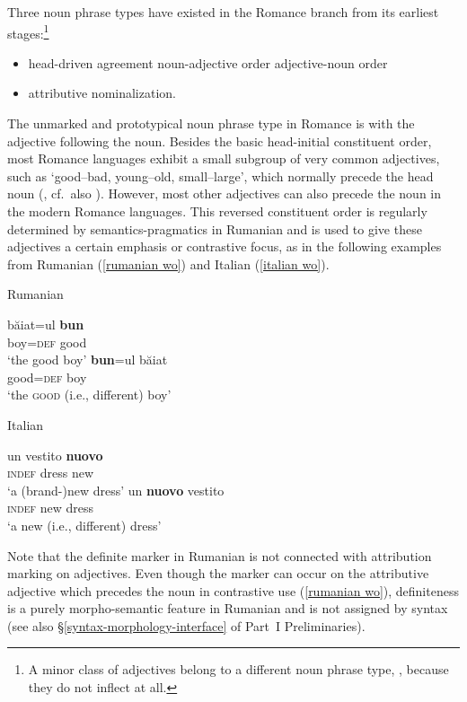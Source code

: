 Three noun phrase types have existed in the Romance branch from its earliest stages:\footnote{A minor class of adjectives belong to a different noun phrase type, 
, because they do not inflect at all.}
\begin{itemize}
\item head\hyp{}driven agreement
	\subitem noun-adjective order
	\subitem adjective-noun order
\item attributive nominalization.
\end{itemize}
The unmarked and prototypical noun phrase type in Romance is  with the adjective following the noun. Besides the basic head-initial constituent order, most Romance languages exhibit a small subgroup of very common adjectives, such as ‘good–bad, young–old, small–large’, which normally precede the head noun (\citealt[146–147]{posner1996}, cf.~also \citealt[340]{silvestri1998}). However, most other adjectives can also precede the noun in the modern Romance languages. This reversed constituent order is regularly determined by semantics-pragmatics in Rumanian and is used to give these adjectives a certain emphasis or contrastive focus, as in the following examples from Rumanian (\ref{rumanian wo}) and Italian (\ref{italian wo}).
\begin{exe}
\ex
\begin{xlist} 
\ex \rm{Rumanian \citep{beyer-etal1987}}\\
\label{rumanian wo} 
\begin{xlist}
\ex	
\gll	băiat=ul \textbf{bun}\\
	boy=\textsc{def} good\\
\glt	‘the good boy’
\ex	
\gll	\textbf{bun}=ul băiat\\
	good=\textsc{def} boy\\
\glt	‘the \textsc{good} (i.e., different) boy’ 
\end{xlist}
\ex \rm{Italian \citep[146]{posner1996}}
\label{italian wo}
\begin{xlist}
\ex	
\gll	un vestito \textbf{nuovo}\\
	\textsc{indef} dress new\\
\glt	‘a (brand-)new dress’
\ex	
\gll	un \textbf{nuovo} vestito\\
	\textsc{indef} new dress\\
\glt	‘a new (i.e., different) dress’
\end{xlist}
\end{xlist}
\end{exe}
Note that the definite marker in Rumanian is not connected with attribution marking on adjectives. Even though the marker can occur on the attributive adjective which precedes the noun in contrastive use (\ref{rumanian wo}), definiteness is a purely morpho-semantic feature in Rumanian and is not assigned by syntax (see also \S\ref{syntax-morphology-interface} of Part~I Preliminaries).

